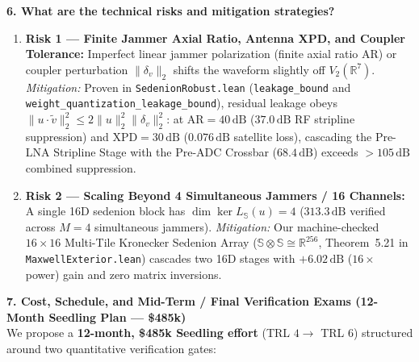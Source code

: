 \documentclass[10pt,a4paper]{article}
\newcommand{\R}{\mathbb{R}}
\newcommand{\Se}{\mathbb{S}}
\begin{document}
\textbf{6. What are the technical risks and mitigation strategies?}
\begin{enumerate}
    \item \textbf{Risk 1 --- Finite Jammer Axial Ratio, Antenna XPD, and Coupler Tolerance:} Imperfect linear jammer polarization (finite axial ratio $\mathrm{AR}$) or coupler perturbation $\|\delta_v\|_2$ shifts the waveform slightly off $V_2(\R^7)$.
    \emph{Mitigation:} Proven in \texttt{SedenionRobust.lean} (\texttt{leakage\_bound} and \texttt{weight\_quantization\_leakage\_bound}), residual leakage obeys $\|u\cdot\tilde{v}\|_2^2 \le 2\|u\|_2^2\|\delta_v\|_2^2$: at $\mathrm{AR}=40\,\mathrm{dB}$ ($37.0\,\mathrm{dB}$ RF stripline suppression) and $\mathrm{XPD}=30\,\mathrm{dB}$ ($0.076\,\mathrm{dB}$ satellite loss), cascading the Pre-LNA Stripline Stage with the Pre-ADC Crossbar ($68.4\,\mathrm{dB}$) exceeds $>105\,\mathrm{dB}$ combined suppression.
    \item \textbf{Risk 2 --- Scaling Beyond 4 Simultaneous Jammers / 16 Channels:} A single 16D sedenion block has $\dim\ker L_{\Se}(u) = 4$ ($313.3\,\mathrm{dB}$ verified across $M=4$ simultaneous jammers).
    \emph{Mitigation:} Our machine-checked $16\times 16$ Multi-Tile Kronecker Sedenion Array ($\Se\otimes\Se \cong \R^{256}$, Theorem~5.21 in \texttt{MaxwellExterior.lean}) cascades two 16D stages with $+6.02\,\mathrm{dB}$ ($16\times$ power) gain and zero matrix inversions.
\end{enumerate}

\textbf{7. Cost, Schedule, and Mid-Term / Final Verification Exams (12-Month Seedling Plan --- \$485k)}\\
We propose a \textbf{12-month, \$485k Seedling effort} (TRL $4 \to$ TRL $6$) structured around two quantitative verification gates:
\end{document}
